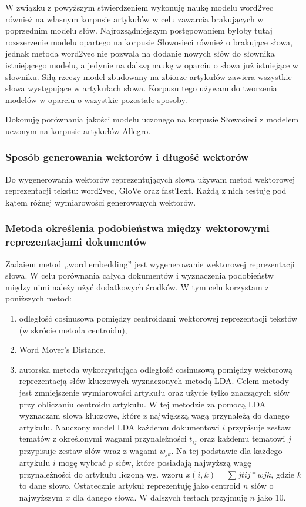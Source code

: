 \documentclass[pl]{minipw} %
\begin{document}
W związku z powyższym stwierdzeniem wykonuję naukę modelu word2vec również na własnym korpusie artykułów w celu zawarcia brakujących w poprzednim modelu słów. Najrozsądniejszym postępowaniem byłoby tutaj rozszerzenie modelu opartego na korpusie Słowosieci również o brakujące słowa, jednak metoda word2vec nie pozwala na dodanie nowych słów do słownika istniejącego modelu, a jedynie na dalszą naukę w oparciu o słowa już istniejące w słowniku. Siłą rzeczy model zbudowany na zbiorze artykułów zawiera wszystkie słowa występujące w artykułach słowa. Korpusu tego używam do tworzenia modelów w oparciu o wszystkie pozostałe sposoby.

Dokonuję porównania jakości modelu uczonego na korpusie Słowosieci z modelem uczonym na korpusie artykułów Allegro.

\subsubsection{Sposób generowania wektorów i długość wektorów}
Do wygenerowania wektorów reprezentujących słowa używam metod wektorowej reprezentacji tekstu: word2vec, GloVe oraz fastText. Każdą z nich testuję pod kątem różnej wymiarowości generowanych wektorów.

\subsubsection{Metoda określenia podobieństwa między wektorowymi reprezentacjami dokumentów}
Zadaiem metod ,,word embedding'' jest wygenerowanie wektorowej reprezentacji słowa. W celu porównania całych dokumentów i wyznaczenia podobieństw między nimi należy użyć dodatkowych środków. W tym celu korzystam z poniższych metod:
\begin{enumerate}
	\item odległość cosinusowa pomiędzy centroidami wektorowej reprezentacji tekstów (w skrócie metoda centroidu),
	\item Word Mover's Distance,
	\item autorska metoda wykorzystująca odległość cosinusową pomiędzy wektorową reprezentacją słów kluczowych wyznaczonych metodą LDA. Celem metody jest zmniejszenie wymiarowości artykułu oraz użycie tylko znaczących słów przy obliczaniu centroidu artykułu. W tej metodzie za pomocą LDA wyznaczam słowa kluczowe, które z największą wagą przynależą do danego artykułu. Nauczony model LDA każdemu dokumentowi $i$ przypisuje zestaw tematów z określonymi wagami przynależności $t_{ij}$ oraz każdemu tematowi $j$ przypisuje zestaw słów wraz z wagami $w_{jk}$. Na tej podstawie dla każdego artykułu $i$ mogę wybrać $p$ słów, które posiadają najwyższą wagę przynależności do artykułu liczoną wg. wzoru $x(i,k)=\sum{j}t{ij}*w{jk}$, gdzie $k$ to dane słowo. Ostatecznie artykuł reprezentuję jako centroid $n$ słów o najwyższym $x$ dla danego słowa. W dalszych testach przyjmuję $n$ jako 10.
\end{enumerate}
\end{document}
